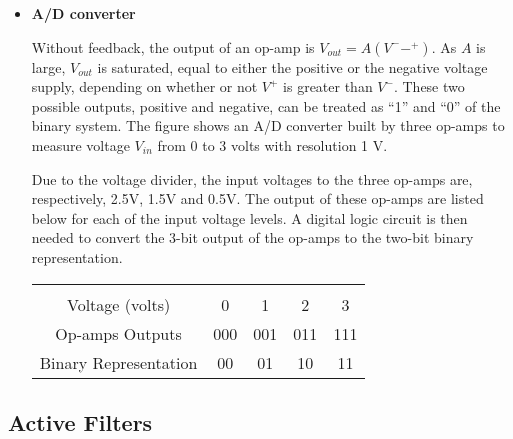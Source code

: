 \begin{itemize}


\item {\bf A/D converter}

Without feedback, the output of an op-amp is $V_{out}=A(V^--^+)$. As $A$ is
large, $V_{out}$ is saturated, equal to either the positive or the negative
voltage supply, depending on whether or not $V^+$ is greater than $V^-$. 
These two possible outputs, positive and negative, can be treated as ``1'' 
and ``0'' of the binary system. The figure shows an A/D converter built by
three op-amps to measure voltage $V_{in}$ from 0 to 3 volts with resolution 1 V.


Due to the voltage divider, the input voltages to the three op-amps are, 
respectively, 2.5V, 1.5V and 0.5V. The output of these op-amps are listed
below for each of the input voltage levels. A digital logic circuit is then
needed to convert the 3-bit output of the op-amps to the two-bit binary 
representation.

\begin{tabular}{c|cccc}\hline \\
Voltage (volts) & 0 	& 1	& 2	& 3	\\
Op-amps Outputs	& 000	& 001	& 011	& 111	\\
Binary Representation	& 00	& 01	& 10	& 11	\\ \hline
\end{tabular}

\end{itemize}
\subsection*{Active Filters}

